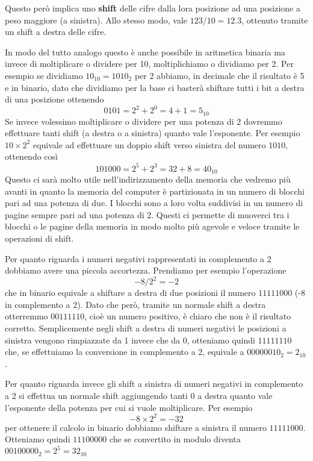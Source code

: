 Questo però implica uno \textbf{shift} delle cifre dalla lora posizione ad una posizione a peso
maggiore (a sinistra). Allo stesso modo, vale $123 / 10 = 12.3$, ottenuto tramite un shift a destra
delle cifre.

In modo del tutto analogo questo è anche possibile in aritmetica binaria ma invece di moltiplicare
o dividere per 10, moltiplichiamo o dividiamo per 2. Per esempio se dividiamo $10_{10} = 1010_2$
per 2 abbiamo, in decimale che il risultato è 5 e in binario, dato che dividiamo per la base ci
basterà shiftare tutti i bit a destra di una posizione ottenendo
\[ 0101 = 2^2 + 2^0 = 4 + 1 = 5_{10} \]
Se invece volessimo moltiplicare o dividere per una potenza di 2 dovremmo effettuare tanti shift
(a destra o a sinistra) quanto vale l'esponente. Per esempio $10 \times 2^2$ equivale ad effettuare
un doppio shift verso sinistra del numero $1010$, ottenendo così
\[ 101000 = 2^5 + 2^3 = 32 + 8 = 40_{10} \]
Questo ci sarà molto utile nell'indirizzamento della memoria che vedremo più avanti in quanto la
memoria del computer è partizionata in un numero di blocchi pari ad una potenza di due. I blocchi
sono a loro volta suddivisi in un numero di pagine sempre pari ad una potenza di 2. Questi ci
permette di muoverci tra i blocchi o le pagine della memoria in modo molto più agevole e veloce
tramite le operazioni di shift.

Per quanto riguarda i numeri negativi rappresentati in complemento a 2 dobbiamo avere una piccola
accortezza. Prendiamo per esempio l'operazione
\[ -8 / 2^2 = -2 \]
che in binario equivale a shiftare a destra di due posizioni il numero $11111000$ (-8 in
complemento a 2). Dato che però, tramite un normale shift a destra otterremmo $00111110$, cioè un
numero positivo, è chiaro che non è il risultato corretto. Semplicemente negli shift a destra di
numeri negativi le posizioni a sinistra vengono rimpiazzate da 1 invece che da 0, otteniamo quindi
$11111110$ che, se effettuiamo la conversione in complemento a 2, equivale a $00000010_2 = 2_{10}$.

Per quanto riguarda invece gli shift a sinistra di numeri negativi in complemento a 2 si effettua
un normale shift aggiungendo tanti 0 a destra quanto vale l'esponente della potenza per cui si
vuole moltiplicare. Per esempio
\[ -8 \times 2^2 = -32 \]
per ottenere il calcolo in binario dobbiamo shiftare a sinistra il numero $11111000$. Otteniamo
quindi $11100000$ che se convertito in modulo diventa $00100000_2 = 2^5 = 32_{10}$

